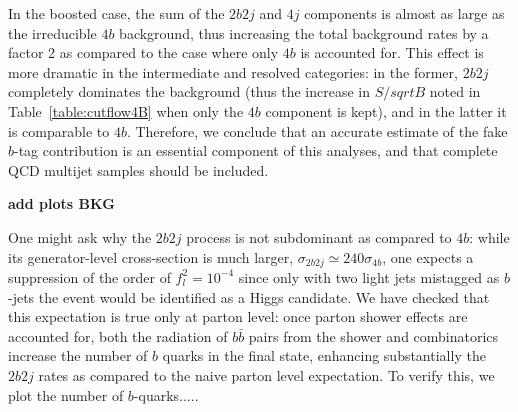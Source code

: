 In the boosted case, the sum of the $2b2j$ and $4j$ components is almost as large as the
irreducible $4b$ background, thus increasing the total background rates by a factor 2 as compared
to the case where only $4b$ is accounted for.
%
This effect is more dramatic in the intermediate and resolved categories: in the former,
$2b2j$ completely dominates the background (thus the increase in $S/sqrt{B}$ noted in
Table~\ref{table:cutflow4B}  when only the $4b$ component is kept), and in the latter
it is comparable to $4b$.
%
Therefore, we conclude that an accurate estimate of the fake $b$-tag contribution is
an essential component of this analyses, and that complete QCD multijet samples
should be included.


  {\bf add plots BKG}

  One might ask why the $2b2j$ process
  is not subdominant as compared to $4b$: while its generator-level cross-section is
  much larger, $\sigma_{2b2j} \simeq 240\sigma_{4b}$, one expects a suppression
  of the order of $f_l^2 =10^{-4}$ since only with two light jets mistagged as $b$-jets the event
  would be identified as a Higgs candidate.
  We have checked that this expectation is true only at parton level: once parton shower effects
  are accounted for, both the radiation of $b\bar{b}$ pairs from the shower and combinatorics increase
  the number of $b$ quarks in the final state, enhancing substantially the $2b2j$ rates as compared
  to the naive parton level expectation.
  To verify this, we plot the number of $b$-quarks.....
